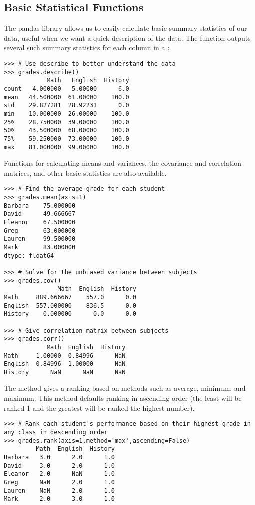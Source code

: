 \subsection*{Basic Statistical Functions}

The pandas library allows us to easily calculate basic summary statistics of our data,
useful when we want a quick description of the data.
The  function
outputs several such summary statistics for each column in a :
\begin{lstlisting}
>>> # Use describe to better understand the data
>>> grades.describe()
            Math   English  History
count   4.000000   5.00000      6.0
mean   44.500000  61.00000    100.0
std    29.827281  28.92231      0.0
min    10.000000  26.00000    100.0
25%    28.750000  39.00000    100.0
50%    43.500000  68.00000    100.0
75%    59.250000  73.00000    100.0
max    81.000000  99.00000    100.0
\end{lstlisting}

Functions for calculating means and variances, the covariance and correlation matrices, and other
basic statistics are also available.

\begin{lstlisting}
>>> # Find the average grade for each student
>>> grades.mean(axis=1)
Barbara    75.000000
David      49.666667
Eleanor    67.500000
Greg       63.000000
Lauren     99.500000
Mark       83.000000
dtype: float64

>>> # Solve for the unbiased variance between subjects
>>> grades.cov()
               Math  English  History
Math     889.666667    557.0      0.0
English  557.000000    836.5      0.0
History    0.000000      0.0      0.0

>>> # Give correlation matrix between subjects
>>> grades.corr()
            Math  English  History
Math     1.00000  0.84996      NaN
English  0.84996  1.00000      NaN
History      NaN      NaN      NaN
\end{lstlisting}

The method  gives a ranking based on methods such as average, minimum, and maximum.
This method defaults ranking in ascending order (the least will be ranked 1 and the greatest will be ranked the highest number).

\begin{lstlisting}
>>> # Rank each student's performance based on their highest grade in any class in descending order
>>> grades.rank(axis=1,method='max',ascending=False)
         Math  English  History
Barbara   3.0      2.0      1.0
David     3.0      2.0      1.0
Eleanor   2.0      NaN      1.0
Greg      NaN      2.0      1.0
Lauren    NaN      2.0      1.0
Mark      2.0      3.0      1.0
\end{lstlisting}

